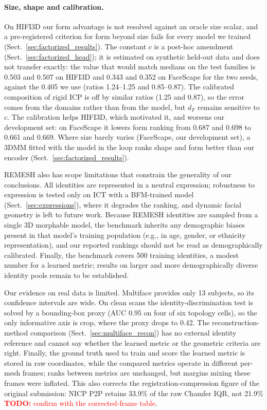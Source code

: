 \documentclass[10pt,twocolumn,letterpaper]{article}
\newcommand{\todo}[1]{\textcolor{red}{\textbf{TODO:} #1}}
\begin{document}
\paragraph{Size, shape and calibration.}
On HIFI3D our form advantage is not resolved against an oracle size scalar, and a pre-registered criterion for form beyond size fails for every model we trained (Sect.~\ref{sec:factorized_results}). The constant $c$ is a post-hoc amendment (Sect.~\ref{sec:factorized_head}); it is estimated on synthetic held-out data and does not transfer exactly: the value that would match medians on the test families is 0.503 and 0.507 on HIFI3D and 0.343 and 0.352 on FaceScape for the two seeds, against the 0.405 we use (ratios 1.24--1.25 and 0.85--0.87). The calibrated composition of rigid ICP is off by similar ratios (1.25 and 0.87), so the error comes from the domains rather than from the model, but $d_F$ remains sensitive to $c$. The calibration helps HIFI3D, which motivated it, and worsens our development set: on FaceScape it lowers form ranking from 0.687 and 0.698 to 0.661 and 0.669. Where size barely varies (FaceScape, our development set), a 3DMM fitted with the model in the loop ranks shape and form better than our encoder (Sect.~\ref{sec:factorized_results}).

REMESH also has scope limitations that constrain the generality of our
conclusions. All identities are represented in a neutral expression;
robustness to expression is tested only on ICT with a BFM-trained model
(Sect.~\ref{sec:expressions}), where it degrades the ranking, and dynamic
facial geometry is left to future work. Because
REMESH identities are sampled from a single 3D morphable model, the benchmark
inherits any demographic biases present in that model's training population
(e.g., in age, gender, or ethnicity representation), and our reported rankings
should not be read as demographically calibrated. Finally, the benchmark
covers 500 training identities, a modest number for a learned metric; results
on larger and more demographically diverse identity pools remain to be
established.

Our evidence on real data is limited. Multiface provides only 13 subjects, so
its confidence intervals are wide. On clean scans the identity-discrimination
test is solved by a bounding-box proxy (AUC 0.95 on four of six topology cells),
so the only informative axis is crop, where the proxy drops to 0.42. The
reconstruction-method comparison (Sect.~\ref{sec:multiface_recon}) has no
external identity reference and cannot say whether the learned metric or the
geometric criteria are right. Finally, the ground truth used to train and
score the learned metric is stored in raw coordinates, while the compared
metrics operate in different per-mesh frames; ranks between metrics are
unchanged, but margins mixing these frames were inflated. This also corrects
the registration-compression figure of the original submission: NICP P2P
retains 33.9\% of the raw Chamfer IQR, not 21.9\% \todo{confirm with the
corrected-frame table}.
\end{document}
